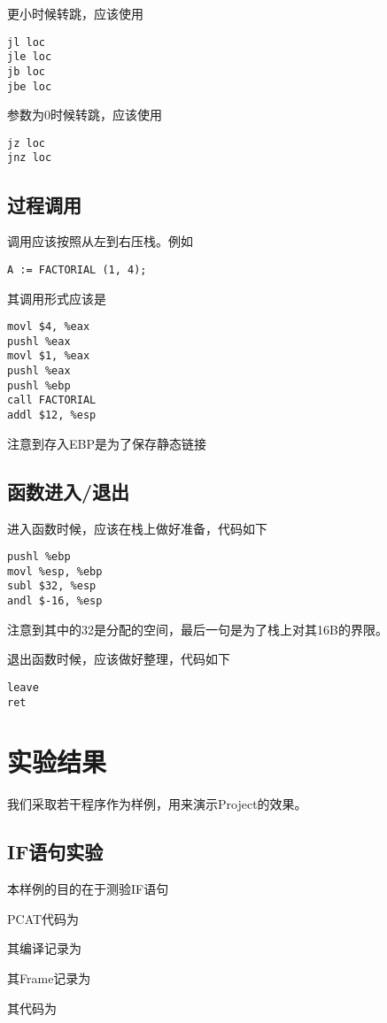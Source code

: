 ﻿\documentclass{article}
\begin{document}
更小时候转跳，应该使用
\begin{lstlisting}
jl loc
jle loc
jb loc
jbe loc
\end{lstlisting}

参数为0时候转跳，应该使用
\begin{lstlisting}
jz loc
jnz loc
\end{lstlisting}

\subsection{过程调用}

调用应该按照从左到右压栈。例如
\begin{lstlisting}
A := FACTORIAL (1, 4);
\end{lstlisting}
其调用形式应该是
\begin{lstlisting}
movl $4, %eax
pushl %eax
movl $1, %eax
pushl %eax
pushl %ebp
call FACTORIAL
addl $12, %esp
\end{lstlisting}
注意到存入EBP是为了保存静态链接

\subsection{函数进入/退出}
进入函数时候，应该在栈上做好准备，代码如下
\begin{lstlisting}
pushl %ebp
movl %esp, %ebp
subl $32, %esp
andl $-16, %esp
\end{lstlisting}
注意到其中的32是分配的空间，最后一句是为了栈上对其16B的界限。

退出函数时候，应该做好整理，代码如下
\begin{lstlisting}
leave
ret
\end{lstlisting}


\section{实验结果}

我们采取若干程序作为样例，用来演示Project的效果。


\subsection{IF语句实验}
本样例的目的在于测验IF语句

PCAT代码为

其编译记录为

其Frame记录为

其代码为

\end{document}
